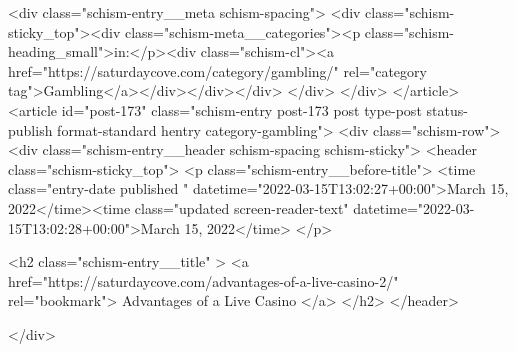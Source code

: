 {		<div class="schism-entry__meta schism-spacing">			<div class="schism-sticky_top"><div class="schism-meta__categories"><p class="schism-heading_small">in:</p><div class="schism-cl"><a href="https://saturdaycove.com/category/gambling/" rel="category tag">Gambling</a></div></div></div>		</div>
	</div>
</article>
<article id="post-173" class="schism-entry post-173 post type-post status-publish format-standard hentry category-gambling">
	<div class="schism-row">		<div class="schism-entry__header schism-spacing schism-sticky">			<header class="schism-sticky_top">				<p class="schism-entry__before-title">
					<time class="entry-date published " datetime="2022-03-15T13:02:27+00:00">March 15, 2022</time><time class="updated screen-reader-text" datetime="2022-03-15T13:02:28+00:00">March 15, 2022</time>				</p>

				<h2 class="schism-entry__title" >
					<a href="https://saturdaycove.com/advantages-of-a-live-casino-2/" rel="bookmark">
						Advantages of a Live Casino					</a>
				</h2>
			</header>

					</div>

}
